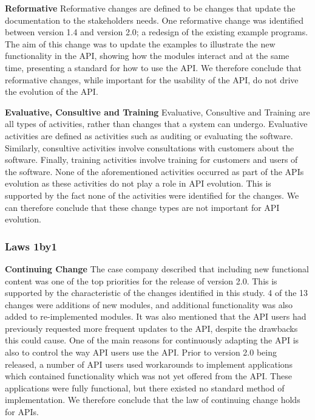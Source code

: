\documentclass{sig-alternate}
\begin{document}
\smallskip \noindent
\textbf{Reformative  }
Reformative changes are defined to be changes that update the documentation to the stakeholders needs.
One reformative change was identified between version 1.4 and version 2.0; a redesign of the existing example programs. The aim of this change was to update the examples to illustrate the new functionality in the API, showing how the modules interact and at the same time, presenting a standard for how to use the API.
We therefore conclude that reformative changes, while important for the usability of the API, do not drive the evolution of the API.

\smallskip \noindent
\textbf{Evaluative, Consultive and Training  }
Evaluative, Consultive and Training are all types of activities, rather than changes that a system can undergo. Evaluative activities are defined as activities such as auditing or evaluating the software. Similarly, consultive activities involve consultations with customers about the software. Finally, training activities involve training for customers and users of the software.
None of the aforementioned activities occurred as part of the APIs evolution as these activities do not play a role in API evolution. This is supported by the fact none of the activities were identified for the changes.
We can therefore conclude that these change types are not important for API evolution.


\subsubsection{Laws 1by1} 

\smallskip \noindent
\textbf{Continuing Change  } 
The case company described that including new functional content was one of the top priorities for the release of version 2.0. This is supported by the characteristic of the changes identified in this study. 4 of the 13 changes were additions of new modules, and additional functionality was also added to re-implemented modules. It was also mentioned that the API users had previously requested more frequent updates to the API, despite the drawbacks this could cause. One of the main reasons for continuously adapting the API is also to control the way API users use the API. Prior to version 2.0 being released, a number of API users used workarounds to implement applications which contained functionality which was not yet offered from the API. These applications were fully functional, but there existed no standard method of implementation. We therefore conclude that the law of continuing change holds for APIs. 
\end{document}
